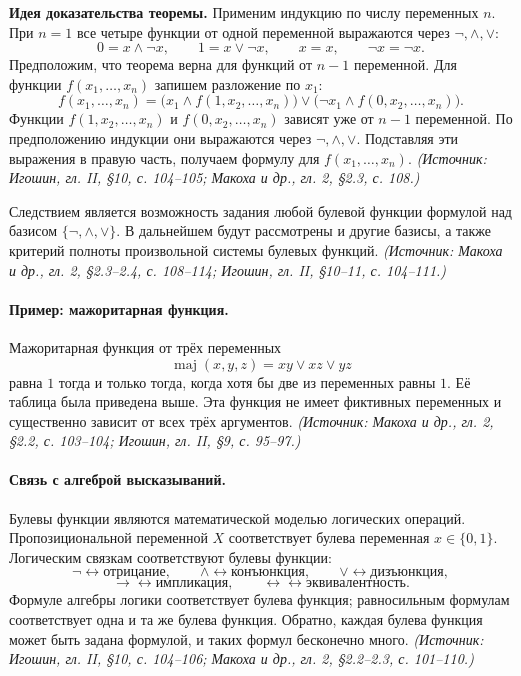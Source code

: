 \documentclass[a4paper,12pt]{article}
\begin{document}
\textbf{Идея доказательства теоремы.} Применим индукцию по числу переменных \(n\). При \(n=1\) все четыре функции от одной переменной выражаются через \(\neg,\land,\lor\):
\[
0=x\land\neg x,\qquad
1=x\lor\neg x,\qquad
x=x,\qquad
\neg x=\neg x.
\]
Предположим, что теорема верна для функций от \(n-1\) переменной. Для функции \(f(x_1,\ldots,x_n)\) запишем разложение по \(x_1\):
\[
f(x_1,\ldots,x_n)
=
\bigl(x_1\land f(1,x_2,\ldots,x_n)\bigr)
\lor
\bigl(\neg x_1\land f(0,x_2,\ldots,x_n)\bigr).
\]
Функции \(f(1,x_2,\ldots,x_n)\) и \(f(0,x_2,\ldots,x_n)\) зависят уже от \(n-1\) переменной. По предположению индукции они выражаются через \(\neg,\land,\lor\). Подставляя эти выражения в правую часть, получаем формулу для \(f(x_1,\ldots,x_n)\).
\textit{(Источник: Игошин, гл. II, §10, с. 104--105; Макоха и др., гл. 2, §2.3, с. 108.)}

Следствием является возможность задания любой булевой функции формулой над базисом \(\{\neg,\land,\lor\}\). В дальнейшем будут рассмотрены и другие базисы, а также критерий полноты произвольной системы булевых функций.
\textit{(Источник: Макоха и др., гл. 2, §2.3--2.4, с. 108--114; Игошин, гл. II, §10--11, с. 104--111.)}

\paragraph{Пример: мажоритарная функция.}
Мажоритарная функция от трёх переменных
\[
\operatorname{maj}(x,y,z)=xy\lor xz\lor yz
\]
равна \(1\) тогда и только тогда, когда хотя бы две из переменных равны \(1\). Её таблица была приведена выше. Эта функция не имеет фиктивных переменных и существенно зависит от всех трёх аргументов.
\textit{(Источник: Макоха и др., гл. 2, §2.2, с. 103--104; Игошин, гл. II, §9, с. 95--97.)}

\paragraph{Связь с алгеброй высказываний.}
Булевы функции являются математической моделью логических операций. Пропозициональной переменной \(X\) соответствует булева переменная \(x\in\{0,1\}\). Логическим связкам соответствуют булевы функции:
\[
\neg \leftrightarrow \text{отрицание},\qquad
\land \leftrightarrow \text{конъюнкция},\qquad
\lor \leftrightarrow \text{дизъюнкция},
\]
\[
\to \leftrightarrow \text{импликация},\qquad
\leftrightarrow \leftrightarrow \text{эквивалентность}.
\]
Формуле алгебры логики соответствует булева функция; равносильным формулам соответствует одна и та же булева функция. Обратно, каждая булева функция может быть задана формулой, и таких формул бесконечно много.
\textit{(Источник: Игошин, гл. II, §10, с. 104--106; Макоха и др., гл. 2, §2.2--2.3, с. 101--110.)}
\end{document}
